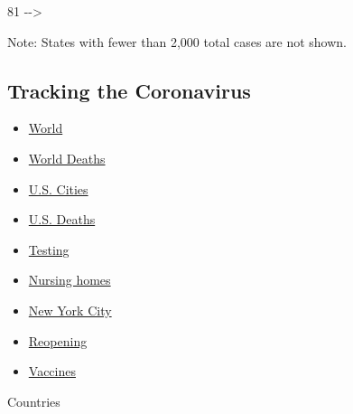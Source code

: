 81 -\/-\textgreater{}

Note: States with fewer than 2,000 total cases are not shown.

\hypertarget{tracking-the-coronavirus}{%
\subsection{Tracking the Coronavirus}\label{tracking-the-coronavirus}}

\begin{itemize}
\tightlist
\item
  \href{https://www.nytimes.com/interactive/2020/world/coronavirus-maps.html}{World}
\item
  \href{https://www.nytimes.com/interactive/2020/04/21/world/coronavirus-missing-deaths.html}{World
  Deaths}
\item
  \href{https://www.nytimes.com/interactive/2020/04/23/upshot/five-ways-to-monitor-coronavirus-outbreak-us.html}{U.S.
  Cities}
\item
  \href{https://www.nytimes.com/interactive/2020/05/05/us/coronavirus-death-toll-us.html}{U.S.
  Deaths}
\item
  \href{https://www.nytimes.com/interactive/2020/us/coronavirus-testing.html}{Testing}
\item
  \href{https://www.nytimes.com/interactive/2020/us/coronavirus-nursing-homes.html}{Nursing
  homes}
\item
  \href{https://www.nytimes.com/interactive/2020/nyregion/new-york-city-coronavirus-cases.html}{New
  York City}
\item
  \href{https://www.nytimes.com/interactive/2020/us/states-reopen-map-coronavirus.html}{Reopening}
\item
  \href{https://www.nytimes.com/interactive/2020/science/coronavirus-vaccine-tracker.html}{Vaccines}
\end{itemize}

Countries

